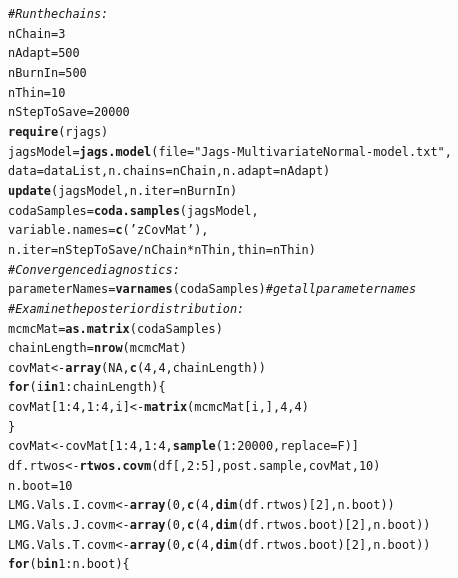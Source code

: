 \documentclass[11pt,a4paper,twoside]{book}\usepackage[]{graphicx}\usepackage[]{color}
\makeatletter
\newcommand{\hlnum}[1]{\textcolor[rgb]{0.686,0.059,0.569}{#1}}%
\newcommand{\hlstr}[1]{\textcolor[rgb]{0.192,0.494,0.8}{#1}}%
\newcommand{\hlcom}[1]{\textcolor[rgb]{0.678,0.584,0.686}{\textit{#1}}}%
\newcommand{\hlopt}[1]{\textcolor[rgb]{0,0,0}{#1}}%
\newcommand{\hlstd}[1]{\textcolor[rgb]{0.345,0.345,0.345}{#1}}%
\newcommand{\hlkwa}[1]{\textcolor[rgb]{0.161,0.373,0.58}{\textbf{#1}}}%
\newcommand{\hlkwb}[1]{\textcolor[rgb]{0.69,0.353,0.396}{#1}}%
\newcommand{\hlkwc}[1]{\textcolor[rgb]{0.333,0.667,0.333}{#1}}%
\newcommand{\hlkwd}[1]{\textcolor[rgb]{0.737,0.353,0.396}{\textbf{#1}}}%
\newenvironment{kframe}{%
 \def\at@end@of@kframe{}%
 \ifinner\ifhmode%
  \def\at@end@of@kframe{\end{minipage}}%
  \begin{minipage}{\columnwidth}%
 \fi\fi%
 \def\FrameCommand##1{\hskip\@totalleftmargin \hskip-\fboxsep
 \colorbox{shadecolor}{##1}\hskip-\fboxsep
     \hskip-\linewidth \hskip-\@totalleftmargin \hskip\columnwidth}%
 \MakeFramed {\advance\hsize-\width
   \@totalleftmargin\z@ \linewidth\hsize
   \@setminipage}}%
 {\par\unskip\endMakeFramed%
 \at@end@of@kframe}
\newenvironment{knitrout}{}{} %
\makeatother
\begin{document}
\begin{codeenv}
\begin{knitrout}
\begin{kframe}
\begin{alltt}
\hlcom{# Run the chains:}
\hlstd{nChain} \hlkwb{=} \hlnum{3}
\hlstd{nAdapt} \hlkwb{=} \hlnum{500}
\hlstd{nBurnIn} \hlkwb{=} \hlnum{500}
\hlstd{nThin} \hlkwb{=} \hlnum{10}
\hlstd{nStepToSave} \hlkwb{=} \hlnum{20000}
\hlkwd{require}\hlstd{(rjags)}
\hlstd{jagsModel} \hlkwb{=} \hlkwd{jags.model}\hlstd{(} \hlkwc{file}\hlstd{=}\hlstr{"Jags-MultivariateNormal-model.txt"} \hlstd{,}
                                                                                                \hlkwc{data}\hlstd{=dataList ,} \hlkwc{n.chains}\hlstd{=nChain ,} \hlkwc{n.adapt}\hlstd{=nAdapt )}
\hlkwd{update}\hlstd{( jagsModel ,} \hlkwc{n.iter}\hlstd{=nBurnIn )}
\hlstd{codaSamples} \hlkwb{=} \hlkwd{coda.samples}\hlstd{( jagsModel ,}
                                                                                                                \hlkwc{variable.names}\hlstd{=}\hlkwd{c}\hlstd{(}\hlstr{'zCovMat'}\hlstd{) ,}
                                                                                                                \hlkwc{n.iter}\hlstd{=nStepToSave}\hlopt{/}\hlstd{nChain}\hlopt{*}\hlstd{nThin ,} \hlkwc{thin}\hlstd{=nThin )}
\hlcom{# Convergence diagnostics:}
\hlstd{parameterNames} \hlkwb{=} \hlkwd{varnames}\hlstd{(codaSamples)} \hlcom{# get all parameter names}
\hlcom{# Examine the posterior distribution:}
\hlstd{mcmcMat} \hlkwb{=} \hlkwd{as.matrix}\hlstd{(codaSamples)}
\hlstd{chainLength} \hlkwb{=} \hlkwd{nrow}\hlstd{(mcmcMat)}
\hlstd{covMat} \hlkwb{<-} \hlkwd{array}\hlstd{(}\hlnum{NA}\hlstd{,} \hlkwd{c}\hlstd{(}\hlnum{4}\hlstd{,}\hlnum{4}\hlstd{,chainLength))}
\hlkwa{for} \hlstd{(i} \hlkwa{in} \hlnum{1}\hlopt{:}\hlstd{chainLength)\{}
\hlstd{covMat[}\hlnum{1}\hlopt{:}\hlnum{4}\hlstd{,}\hlnum{1}\hlopt{:}\hlnum{4}\hlstd{,i]}\hlkwb{<-}\hlkwd{matrix}\hlstd{(mcmcMat[i,],} \hlnum{4}\hlstd{,} \hlnum{4}\hlstd{)}
\hlstd{\}}
\hlstd{covMat} \hlkwb{<-} \hlstd{covMat[}\hlnum{1}\hlopt{:}\hlnum{4}\hlstd{,}\hlnum{1}\hlopt{:}\hlnum{4}\hlstd{,}\hlkwd{sample}\hlstd{(}\hlnum{1}\hlopt{:}\hlnum{20000}\hlstd{,} \hlkwc{replace}\hlstd{=F)]}
\hlstd{df.rtwos} \hlkwb{<-}\hlkwd{rtwos.covm}\hlstd{(df[,}\hlnum{2}\hlopt{:}\hlnum{5}\hlstd{], post.sample, covMat,} \hlnum{10}\hlstd{)}
\hlstd{n.boot} \hlkwb{=} \hlnum{10}
\hlstd{LMG.Vals.I.covm}\hlkwb{<-}\hlkwd{array}\hlstd{(}\hlnum{0}\hlstd{,} \hlkwd{c}\hlstd{(}\hlnum{4}\hlstd{,}\hlkwd{dim}\hlstd{(df.rtwos)[}\hlnum{2}\hlstd{], n.boot))}
\hlstd{LMG.Vals.J.covm}\hlkwb{<-}\hlkwd{array}\hlstd{(}\hlnum{0}\hlstd{,} \hlkwd{c}\hlstd{(}\hlnum{4}\hlstd{,}\hlkwd{dim}\hlstd{(df.rtwos.boot)[}\hlnum{2}\hlstd{], n.boot))}
\hlstd{LMG.Vals.T.covm}\hlkwb{<-}\hlkwd{array}\hlstd{(}\hlnum{0}\hlstd{,} \hlkwd{c}\hlstd{(}\hlnum{4}\hlstd{,}\hlkwd{dim}\hlstd{(df.rtwos.boot)[}\hlnum{2}\hlstd{], n.boot))}
\hlkwa{for} \hlstd{(b} \hlkwa{in} \hlnum{1}\hlopt{:}\hlstd{n.boot)\{}


\end{alltt}
\end{kframe}
\end{knitrout}
\end{codeenv}
\end{document}
